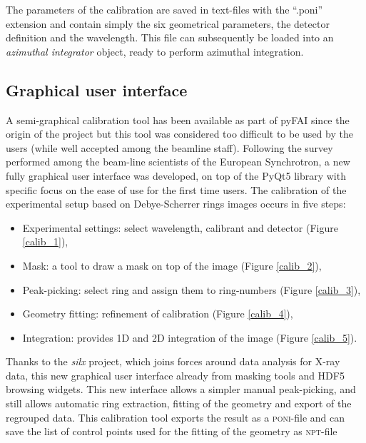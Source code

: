 \documentclass[preprint, pdf]{iucr}              %
\begin{document}
The parameters of the calibration are saved in text-files with the ``.poni''
extension and contain simply the six geometrical parameters, the detector
definition and the wavelength.
This file can subsequently be loaded into an \textit{azimuthal integrator}
object, ready to perform azimuthal integration.

\subsection{Graphical user interface}

A semi-graphical calibration tool has been available as part of pyFAI
\cite{fv5028} since the origin of the project but this tool was considered too
difficult to be used by the users (while well accepted among the beamline
staff).
Following the survey performed among the beam-line scientists of the European
Synchrotron, a new fully graphical user interface was developed, on top of 
the PyQt5 library \cite{pyqt} with specific focus on the ease of use for the
first time users.
The calibration of the experimental setup based on Debye-Scherrer rings images 
occurs in five steps:
\begin{itemize}
  \item Experimental settings: select wavelength, calibrant and detector (Figure
  \ref{calib_1}),
  \item Mask: a tool to draw a mask on top of the image (Figure
  \ref{calib_2}),
  \item Peak-picking: select ring and assign them to ring-numbers (Figure
  \ref{calib_3}),
  \item Geometry fitting: refinement of calibration (Figure
  \ref{calib_4}), 
  \item Integration: provides 1D and 2D integration of the image (Figure
  \ref{calib_5}). 
\end{itemize}

Thanks to the \textit{silx} \cite{silx} project, which joins
forces around data analysis for X-ray data, this new graphical user interface
already from masking tools and HDF5 browsing widgets.
This new interface allows a simpler manual peak-picking,
and still allows automatic ring extraction, fitting of the geometry and export
of the regrouped data. 
This calibration tool exports the result as a \textsc{poni}-file and can
save the list of control points used  for the fitting of the geometry as
\textsc{npt}-file
\end{document}
